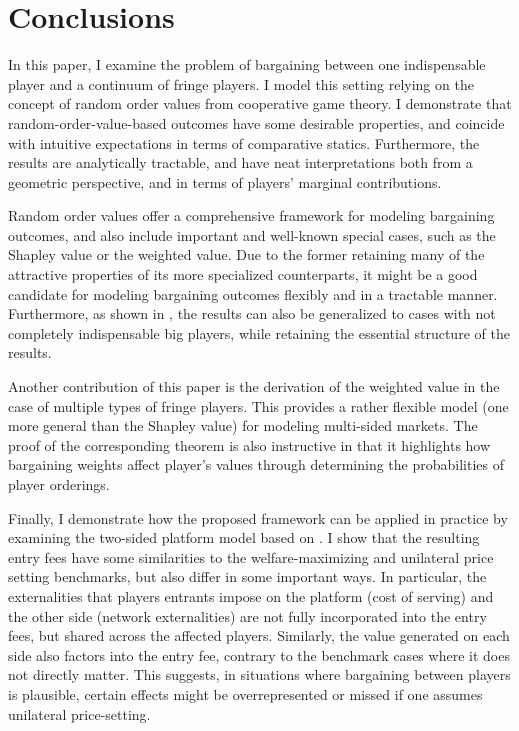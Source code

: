 \documentclass[a4paper]{article}
\begin{document}
\section{Conclusions}
\label{sec:conclusions}

In this paper, I examine the problem of bargaining between one indispensable player and a continuum of fringe players.
I model this setting relying on the concept of random order values from cooperative game theory.
I demonstrate that random-order-value-based outcomes have some desirable properties, and coincide with intuitive expectations in terms of comparative statics.
Furthermore, the results are analytically tractable, and have neat interpretations both from a geometric perspective, and in terms of players' marginal contributions.

Random order values offer a comprehensive framework for modeling bargaining outcomes, and also include important and well-known special cases, such as the Shapley value or the weighted value.
Due to the former retaining many of the attractive properties of its more specialized counterparts, it might be a good candidate for modeling bargaining outcomes flexibly and in a tractable manner.
Furthermore, as shown in , the results can also be generalized to cases with not completely indispensable big players, while retaining the essential structure of the results.

Another contribution of this paper is the derivation of the weighted value in the case of multiple types of fringe players.
This provides a rather flexible model (one more general than the Shapley value) for modeling multi-sided markets.
The proof of the corresponding theorem is also instructive in that it highlights how bargaining weights affect player's values through determining the probabilities of player orderings.

Finally, I demonstrate how the proposed framework can be applied in practice by
examining the two-sided platform model based on \textcite{armstrong2006competition}.
I show that the resulting entry fees have some similarities to the welfare-maximizing and unilateral price setting benchmarks, but also differ in some important ways.
In particular, the externalities that players entrants impose on the platform (cost of serving) and the other side (network externalities) are not fully incorporated into the entry fees, but shared across the affected players.
Similarly, the value generated on each side also factors into the entry fee, contrary to the benchmark cases where it does not directly matter.
This suggests, in situations where bargaining between players is plausible, certain effects might be overrepresented or missed if one assumes unilateral price-setting.
\end{document}
